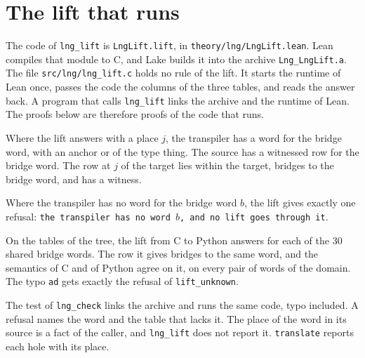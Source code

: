 \section{The lift that runs}

The code of \texttt{lng\_lift} is \texttt{LngLift.lift}, in \texttt{theory/lng/LngLift.lean}. Lean compiles that
module to C, and Lake builds it into the archive \texttt{Lng\_LngLift.a}. The file \texttt{src/lng/lng\_lift.c}
holds no rule of the lift. It starts the runtime of Lean once, passes the code the columns of the three tables,
and reads the answer back. A program that calls \texttt{lng\_lift} links the archive and the runtime of Lean. The
proofs below are therefore proofs of the code that runs.

\begin{theorem}
Where the lift answers with a place $j$, the transpiler has a word for the bridge word, with an anchor or of the
type thing. The source has a witnessed row for the bridge word. The row at $j$ of the target lies within the
target, bridges to the bridge word, and has a witness.
\end{theorem}

\begin{theorem}
Where the transpiler has no word for the bridge word $b$, the lift gives exactly one refusal: \texttt{the
transpiler has no word $b$, and no lift goes through it}.
\end{theorem}

\begin{theorem}
On the tables of the tree, the lift from C to Python answers for each of the 30 shared bridge words. The row it
gives bridges to the same word, and the semantics of C and of Python agree on it, on every pair of words of the
domain. The typo \texttt{ad} gets exactly the refusal of \texttt{lift\_unknown}.
\end{theorem}

The test of \texttt{lng\_check} links the archive and runs the same code, typo included. A refusal names the word
and the table that lacks it. The place of the word in its source is a fact of the caller, and
\texttt{lng\_lift} does not report it. \texttt{translate} reports each hole with its place.
